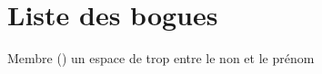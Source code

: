 \chapter{Liste des bogues}
\hypertarget{bug}{}\label{bug}

\begin{DoxyRefList}
\item[Membre \doxylink{class_individu_a3277118a71f354a107961e3b4975d631}{Individu\+::to\+String} ()]\label{bug__bug000001}%
%
un espace de trop entre le non et le prénom
\end{DoxyRefList}